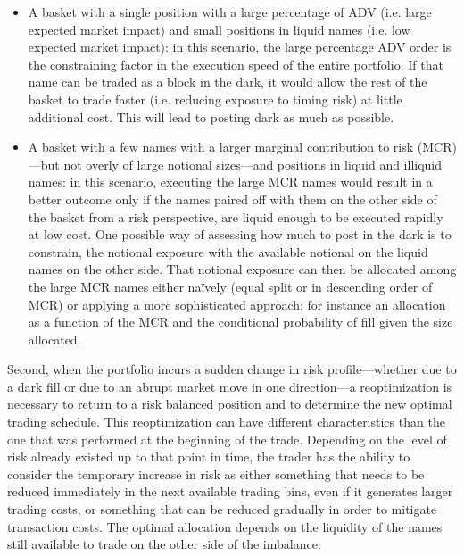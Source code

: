 \begin{itemize}
\item A basket with a single position with a large percentage of ADV (i.e. large expected market impact) and small positions in liquid names (i.e. low expected market impact): in this scenario, the large percentage ADV order is the constraining factor in the execution speed of the entire portfolio. If that name can be traded as a block in the dark, it would allow the rest of the basket to trade faster (i.e. reducing exposure to timing risk) at little additional cost. This will lead to posting dark as much as possible.

\item A basket with a few names with a larger marginal contribution to risk (MCR)---but not overly of large notional sizes---and positions in liquid and illiquid names: in this scenario, executing the large MCR names would result in a better outcome only if the names paired off with them on the other side of the basket from a risk perspective, are liquid enough to be executed rapidly at low cost. One possible way of assessing how much to post in the dark is to constrain, the notional exposure with the available notional on the liquid names on the other side. That notional exposure can then be allocated among the large MCR names either na\"ively (equal split or in descending order of MCR) or applying a more sophisticated approach: for instance an allocation as a function of the MCR and the conditional probability of fill given the size allocated.
\end{itemize}


Second, when the portfolio incurs a sudden change in risk profile---whether due to a dark fill or due to an abrupt market move in one direction---a reoptimization is necessary to return to a risk balanced position and to determine the new optimal trading schedule. This reoptimization can have different characteristics than the one that was performed at the beginning of the trade. Depending on the level of risk already existed up to that point in time, the trader has the ability to consider the temporary increase in risk as either something that needs to be reduced immediately in the next available trading bins, even if it generates larger trading costs, or something that can be reduced gradually in order to mitigate transaction costs. The optimal allocation depends on the liquidity of the names still available to trade on the other side of the imbalance. \twomedskip


